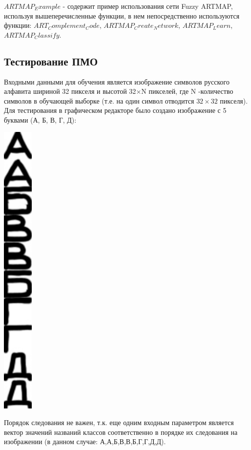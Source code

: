 $ARTMAP_Example$ - содержит пример использования сети Fuzzy ARTMAP, используя вышеперечисленные функции, в нем непосредственно используются функции: $ART_Complement_Code$, $ARTMAP_Create_Network$, $ARTMAP_Learn$, $ARTMAP_Classify$.



\subsection{Тестирование ПМО}


Входными данными для обучения является изображение символов русского алфавита шириной 32 пикселя и высотой 32$\times$N пикселей, где N -количество символов в обучающей выборке (т.е. на один символ отводится $32\times 32$ пикселя). Для тестирования в графическом редакторе было создано изображение с 5 буквами (А, Б, В, Г, Д):
\begin{center}
	\includegraphics[width=1.5cm]{image_for_report/teach_5.jpg}
\end{center}

Порядок следования не важен, т.к. еще одним входным параметром является вектор значений названий классов соответственно в порядке их следования на изображении (в данном случае: {А,А,Б,В,В,Б,Г,Г,Д,Д}).

